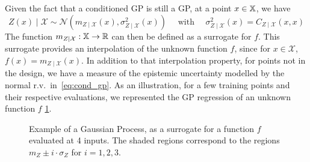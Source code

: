 \documentclass[../../Main_ManuscritThese.tex]{subfiles}
\newcommand\imgpath{/home/victor/acadwriting/Manuscrit/Text/Chapter4/img/}
\begin{document}
Given the fact that a conditioned GP is still a GP, at a point $x \in \mathbb{X}$, we have
\begin{equation}
  \label{eq:cond_gp}
  Z(x) \mid \mathcal{X} \sim \mathcal{N}\left(m_{Z\mid \mathcal{X}}(x), \sigma^2_{Z\mid \mathcal{X}}(x)\right) \quad \text{ with } \quad \sigma^2_{Z\mid \mathcal{X}}(x) = C_{Z \mid \mathcal{X}}(x, x)
\end{equation}
The function $m_{Z \mid \mathcal{X}}: \mathbb{X} \rightarrow \mathbb{R}$ can then be defined as a surrogate for $f$. This surrogate provides an interpolation of the unknown function $f$, since for $x \in \mathcal{X}$, $f(x) = m_{Z \mid \mathcal{X}}(x)$.
In addition to that interpolation property, for points not in the design, we have a measure of the epistemic uncertainty modelled by the normal r.v.\ in~\eqref{eq:cond_gp}. As an illustration, for a few training points and their respective evaluations, we represented the GP regression of an unknown function $f$ \cref{fig:example_GP}.

\begin{figure}[ht]
  \centering
  
  \caption[Illustration of GP regression]{\label{fig:example_GP} Example of a Gaussian Process, as a surrogate for a function $f$ evaluated at 4 inputs. The shaded regions correspond to the regions $m_Z \pm i \cdot \sigma_Z$ for $i=1, 2,3$.}
\end{figure}
\end{document}
